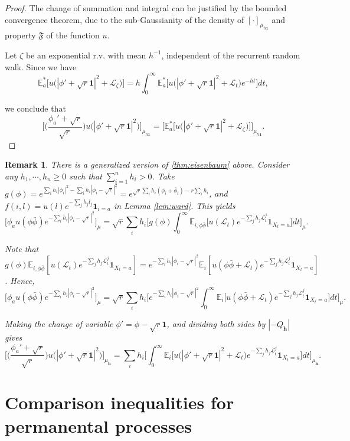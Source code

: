 \documentclass[a4paper, 11pt]{article}
\newcommand{\E}{\mathbb{E}}
\newcommand{\allone}{\mathbf{1}}
\newcommand{\ind}{\mathbf{1}}
\newcommand{\Ell}{\mathcal{L}}
\newtheorem{rem}{Remark}[thm]
\begin{document}
\begin{proof}
The change of summation and integral can be justified by the bounded convergence theorem, due to the sub-Gaussianity of the density of $[\cdot]_{\mu_{h\allone}}$ and property $\mathfrak{F}$ of the function $u$.

Let $\zeta$ be an exponential r.v. with mean $h^{-1}$, independent of the recurrent random walk. Since we have
\[\E_a^*\big[ u\big(|\phi'+\sqrt{r}\allone|^2+\Ell_\zeta\big)\big]
=h\int_0^\infty\E_a^*\big[ u\big(|\phi'+\sqrt{r}\allone|^2+\Ell_t\big)e^{-ht}\big]dt,\]

we conclude that
\[
\bigg[ \bigg(\frac{\phi_a'+\sqrt{r}}{\sqrt{r}}\bigg) u\big(|\phi'+\sqrt{r}\allone|^2\big)\bigg]_{\mu_{h\allone}}
= \big[\E_a^*\big[ u\big(|\phi'+\sqrt{r}\allone|^2+\Ell_\zeta\big)\big]\big]_{\mu_{h\allone}}.\]
\end{proof}

\vspace{.3em} \begin{rem}
There is a generalized version of \cref{thm:eisenbaum} above. Consider any $h_1,\cdots, h_n\geq 0$ such that $\sum_{i=1}^n h_i>0$. Take $g(\phi)=e^{\sum_i h_i|\phi_i|^2-\sum_ih_i|\phi_i-\sqrt{r}|^2}=e^{\sqrt{r}\sum_i h_i(\phi_i+\bar{\phi}_i)-r\sum_i h_i}$, and $f(i,l)= u(l)e^{-\sum_jh_jl_j}\ind_{i=a}$ in Lemma \ref{lem:ward}. This yields
\[\big[ \phi_a u(\phi\bar{\phi})e^{-\sum_ih_i|\phi_i-\sqrt{r}|^2}\big]_\mu=\sqrt{r}\sum_ih_i\bigg[ g(\phi)\int_0^\infty\E_{i,\phi\bar{\phi}}\big[ u(\Ell_t)e^{-\sum_j h_j\Ell_t^j}\ind_{X_t=a}\big]dt\bigg]_\mu.\]

Note that $g(\phi)\E_{i,\phi\bar{\phi}}[ u(\Ell_t)e^{-\sum_j h_j\Ell_t^j}\ind_{X_t=a}]=e^{-\sum_ih_i|\phi_i-\sqrt{r}|^2}\E_i[ u(\phi\bar{\phi}+\Ell_t)e^{-\sum_j h_j\Ell_t^j}\ind_{X_t=a}]$. Hence,
\[\big[ \phi_a u(\phi\bar{\phi})e^{-\sum_ih_i|\phi_i-\sqrt{r}|^2}\big]_\mu=\sqrt{r}\sum_ih_i\bigg[ e^{-\sum_ih_i|\phi_i-\sqrt{r}|^2}\int_0^\infty\E_i\big[ u(\phi\bar{\phi}+\Ell_t)e^{-\sum_j h_j\Ell_t^j}\ind_{X_t=a}\big]dt\bigg]_\mu.\]

Making the change of variable $\phi'=\phi-\sqrt{r}\allone$, and
dividing both sides by $|-Q_{\bm{h}}|$ gives
\[\bigg[ \bigg(\frac{\phi_a'+\sqrt{r}}{\sqrt{r}}\bigg) u\big(|\phi'+\sqrt{r}\allone|^2\big)\bigg]_{\mu_{\bm{h}}}
= \sum_ih_i\bigg[\int_0^\infty\E_i\big[ u\big(|\phi'+\sqrt{r}\allone|^2+\Ell_t\big)e^{-\sum_j h_j\Ell_t^j}\ind_{X_t=a}\big]dt\bigg]_{\mu_{\bm{h}}}.\]
\end{rem}

\section{Comparison inequalities for permanental processes}
\end{document}
